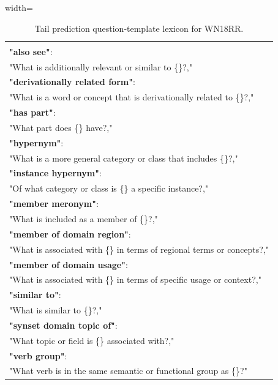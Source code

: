 \documentclass[11pt]{article}
\begin{document}
\begin{table}[ht]
  \centering
  \begin{adjustbox}{width=\linewidth}
  \begin{tabular}{|p{1.0\linewidth}|}
    \hline
    {\footnotesize\ttfamily\raggedright\sloppy
\textbf{\# tail\_prediction:}\\
\textbf{"also see"}: \\
"What is additionally relevant or similar to \{\}?,"\\
\textbf{"derivationally related form"}: \\
"What is a word or concept that is derivationally related to \{\}?,"\\
\textbf{"has part"}: \\
"What part does \{\} have?,"\\
\textbf{"hypernym"}: \\
"What is a more general category or class that includes \{\}?,"\\
\textbf{"instance hypernym"}: \\
"Of what category or class is \{\} a specific instance?,"\\
\textbf{"member meronym"}: \\
"What is included as a member of \{\}?,"\\
\textbf{"member of domain region"}: \\
"What is associated with \{\} in terms of regional terms or concepts?,"\\
\textbf{"member of domain usage"}: \\
"What is associated with \{\} in terms of specific usage or context?,"\\
\textbf{"similar to"}: \\
"What is similar to \{\}?,"\\
\textbf{"synset domain topic of"}: \\
"What topic or field is \{\} associated with?,"\\
\textbf{"verb group"}: \\
"What verb is in the same semantic or functional group as \{\}?"
    }\\ \hline
  \end{tabular}
  \end{adjustbox}
  \caption{Tail prediction question-template lexicon for WN18RR.}
  \label{tab:tail_prediction_templates_wn}
\end{table}
\end{document}
